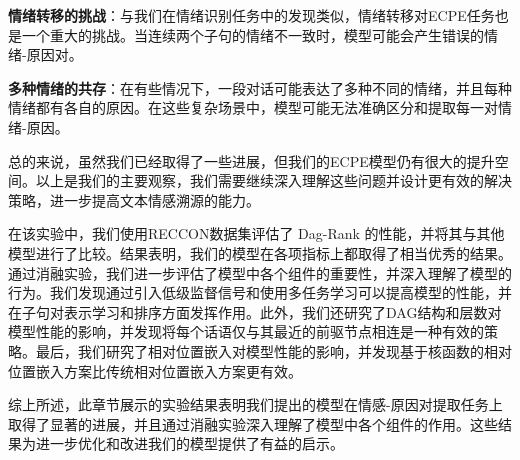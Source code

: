     \textbf{情绪转移的挑战}：与我们在情绪识别任务中的发现类似，情绪转移对ECPE任务也是一个重大的挑战。当连续两个子句的情绪不一致时，模型可能会产生错误的情绪-原因对。

    \textbf{多种情绪的共存}：在有些情况下，一段对话可能表达了多种不同的情绪，并且每种情绪都有各自的原因。在这些复杂场景中，模型可能无法准确区分和提取每一对情绪-原因。

总的来说，虽然我们已经取得了一些进展，但我们的ECPE模型仍有很大的提升空间。以上是我们的主要观察，我们需要继续深入理解这些问题并设计更有效的解决策略，进一步提高文本情感溯源的能力。



在该实验中，我们使用RECCON数据集评估了 Dag-Rank 的性能，并将其与其他模型进行了比较。结果表明，我们的模型在各项指标上都取得了相当优秀的结果。
通过消融实验，我们进一步评估了模型中各个组件的重要性，并深入理解了模型的行为。我们发现通过引入低级监督信号和使用多任务学习可以提高模型的性能，并在子句对表示学习和排序方面发挥作用。此外，我们还研究了DAG结构和层数对模型性能的影响，并发现将每个话语仅与其最近的前驱节点相连是一种有效的策略。最后，我们研究了相对位置嵌入对模型性能的影响，并发现基于核函数的相对位置嵌入方案比传统相对位置嵌入方案更有效。

综上所述，此章节展示的实验结果表明我们提出的模型在情感-原因对提取任务上取得了显著的进展，并且通过消融实验深入理解了模型中各个组件的作用。这些结果为进一步优化和改进我们的模型提供了有益的启示。